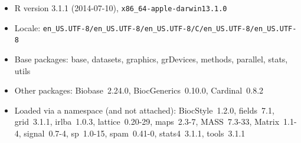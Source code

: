 \documentclass[a4paper]{article}
\begin{document}
\begin{itemize}\raggedright
  \item R version 3.1.1 (2014-07-10), \verb|x86_64-apple-darwin13.1.0|
  \item Locale: \verb|en_US.UTF-8/en_US.UTF-8/en_US.UTF-8/C/en_US.UTF-8/en_US.UTF-8|
  \item Base packages: base, datasets, graphics, grDevices,
    methods, parallel, stats, utils
  \item Other packages: Biobase~2.24.0, BiocGenerics~0.10.0,
    Cardinal~0.8.2
  \item Loaded via a namespace (and not attached):
    BiocStyle~1.2.0, fields~7.1, grid~3.1.1, irlba~1.0.3,
    lattice~0.20-29, maps~2.3-7, MASS~7.3-33, Matrix~1.1-4,
    signal~0.7-4, sp~1.0-15, spam~0.41-0, stats4~3.1.1,
    tools~3.1.1
\end{itemize}
\end{document}
